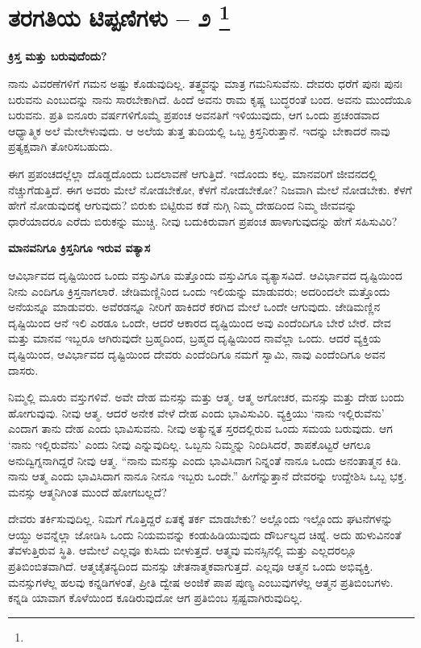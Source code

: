 
\chapter[ತರಗತಿಯ ಟಿಪ್ಪಣಿಗಳು – ೨ ]{ತರಗತಿಯ ಟಿಪ್ಪಣಿಗಳು – ೨ \protect\footnote{}}

\centerline{\textbf{ಕ್ರಿಸ್ತ ಮತ್ತು ಬರುವುದೆಂದು?}}

ನಾನು ವಿವರಣೆಗಳಿಗೆ ಗಮನ ಅಷ್ಟು ಕೊಡುವುದಿಲ್ಲ. ತತ್ತ್ವವನ್ನು ಮಾತ್ರ ಗಮನಿಸುವೆನು. ದೇವರು ಧರೆಗೆ ಪುನಃ ಪುನಃ ಬರುವನು ಎಂಬುದನ್ನು ನಾನು ಸಾರಬೇಕಾಗಿದೆ. ಹಿಂದೆ ಅವನು ರಾಮ ಕೃಷ್ಣ ಬುದ್ಧರಂತೆ ಬಂದ. ಅವನು ಮುಂದೆಯೂ ಬರುವನು. ಪ್ರತಿ ಐನೂರು ವರ್ಷಗಳಿಗೊಮ್ಮೆ ಪ್ರಪಂಚ ಅವನತಿಗೆ ಇಳಿಯುವುದು, ಆಗ ಒಂದು ಪ್ರಚಂಡವಾದ ಆಧ್ಯಾತ್ಮಿಕ ಅಲೆ ಮೇಲೇಳುವುದು. ಆ ಅಲೆಯ ತುತ್ತ ತುದಿಯಲ್ಲಿ ಒಬ್ಬ ಕ್ರಿಸ್ತನಿರುತ್ತಾನೆ. ಇದನ್ನು ಬೇಕಾದರೆ ನಾವು ಪ್ರತ್ಯಕ್ಷವಾಗಿ ತೋರಿಸಬಹುದು.

ಈಗ ಪ್ರಪಂಚದಲ್ಲೆಲ್ಲಾ ದೊಡ್ಡದೊಂದು ಬದಲಾವಣೆ ಆಗುತ್ತಿದೆ. ಇದೊಂದು ಕಲ್ಪ. ಮಾನವರಿಗೆ ಜೀವನದಲ್ಲಿ ನೆಚ್ಚುಗೆಡುತ್ತಿದೆ. ಈಗ ಅವರು ಮೇಲೆ ನೋಡಬೇಕೋ, ಕೆಳಗೆ ನೋಡಬೇಕೋ? ನಿಜವಾಗಿ ಮೇಲೆ ನೋಡಬೇಕು. ಕೆಳಗೆ ಹೇಗೆ ನೋಡುವುದಕ್ಕೆ ಆಗುವುದು? ಬಿರುಕು ಬಿಟ್ಟಿರುವ ಕಡೆ ನುಗ್ಗಿ ನಿಮ್ಮ ದೇಹದಿಂದ ನಿಮ್ಮ ಜೀವವನ್ನು ಧಾರೆಯಾದರೂ ಎರೆದು ಬಿರುಕನ್ನು ಮುಚ್ಚಿ. ನೀವು ಬದುಕಿರುವಾಗ ಪ್ರಪಂಚ ಹಾಳಾಗುವುದನ್ನು ಹೇಗೆ ಸಹಿಸುವಿರಿ?

\begin{center}
\textbf{ಮಾನವನಿಗೂ ಕ್ರಿಸ್ತನಿಗೂ ಇರುವ ವತ್ಯಾಸ}
\end{center}

ಆವಿರ್ಭಾವದ ದೃಷ್ಟಿಯಿಂದ ಒಂದು ವಸ್ತುವಿಗೂ ಮತ್ತೊಂದು ವಸ್ತುವಿಗೂ ವ್ಯತ್ಯಾಸವಿದೆ. ಆವಿರ್ಭಾವದ ದೃಷ್ಟಿಯಿಂದ ನೀನು ಎಂದಿಗೂ ಕ್ರಿಸ್ತನಾಗಲಾರೆ. ಜೇಡಿಮಣ್ಣಿನಿಂದ ಒಂದು ಇಲಿಯನ್ನು ಮಾಡುವರು; ಅದರಿಂದಲೇ ಮತ್ತೊಂದು ಅನೆಯನ್ನೂ ಮಾಡುವರು. ಅವೆರಡನ್ನೂ ನೀರಿಗೆ ಹಾಕಿದರೆ ಕರಗಿದ ಮೇಲೆ ಒಂದೇ ಆಗುವುದು. ಜೇಡಿಮಣ್ಣಿನ ದೃಷ್ಟಿಯಿಂದ ಆನೆ ಇಲಿ ಎರಡೂ ಒಂದೇ, ಆದರೆ ಆಕಾರದ ದೃಷ್ಟಿಯಿಂದ ಅವು ಎಂದೆಂದಿಗೂ ಬೇರೆ ಬೇರೆ. ದೇವ ಮತ್ತು ಮಾನವ ಇಬ್ಬರೂ ಆಗಿರುವುದೇ ಬ್ರಹ್ಮದಿಂದ, ಬ್ರಹ್ಮದ ದೃಷ್ಟಿಯಿಂದ ನಾವೆಲ್ಲಾ ಒಂದು. ಆದರೆ ವ್ಯಕ್ತಿಯ ದೃಷ್ಟಿಯಿಂದ, ಆವಿರ್ಭಾವದ ದೃಷ್ಟಿಯಿಂದ ದೇವರು ಎಂದೆಂದಿಗೂ ನಮಗೆ ಸ್ವಾಮಿ, ನಾವು ಎಂದೆಂದಿಗೂ ಅವನ ದಾಸರು.

ನಿಮ್ಮಲ್ಲಿ ಮೂರು ವಸ್ತುಗಳಿವೆ. ಅವೇ ದೇಹ ಮನಸ್ಸು ಮತ್ತು ಆತ್ಮ. ಆತ್ಮ ಅಗೋಚರ, ಮನಸ್ಸು ಮತ್ತು ದೇಹ ಬಂದು ಹೋಗುವುವು. ನೀವು ಆತ್ಮ. ಆದರೆ ಅನೇಕ ವೇಳೆ ದೇಹ ಎಂದು ಭಾವಿಸುವಿರಿ. ವ್ಯಕ್ತಿಯು ‘ನಾನು ಇಲ್ಲಿರುವೆನು’ ಎಂದಾಗ ತಾನು ದೇಹ ಎಂದು ಭಾವಿಸುವನು. ನೀವು ಅತ್ಯುನ್ನತ ಸ್ತರದಲ್ಲಿರುವ ಒಂದು ಸಮಯ ಬರುವುದು. ಆಗ ‘ನಾನು ಇಲ್ಲಿರುವೆನು’ ಎಂದು ನೀವು ಎನ್ನುವುದಿಲ್ಲ. ಒಬ್ಬನು ನಿಮ್ಮನ್ನು ನಿಂದಿಸಿದರೆ, ಶಾಪಕೊಟ್ಟರೆ ಆಗಲೂ ಅನುದ್ವಿಗ್ನನಾಗಿದ್ದರೆ ನೀವು ಆತ್ಮ. “ನಾನು ಮನಸ್ಸು ಎಂದು ಭಾವಿಸಿದಾಗ ನಿನ್ನಂತೆ ನಾನೂ ಒಂದು ಅನಂತಾತ್ಮನ ಕಿಡಿ. ನಾನು ಆತ್ಮ ಎಂದು ಭಾವಿಸಿದಾಗ ನಾನೂ ನೀನೂ ಇಬ್ಬರು ಒಂದೇ.” ಹೀಗೆನ್ನುತ್ತಾನೆ ದೇವರನ್ನು ಉದ್ದೇಶಿಸಿ ಒಬ್ಬ ಭಕ್ತ. ಮನಸ್ಸು ಆತ್ಮನಿಗಿಂತ ಮುಂದೆ ಹೋಗಬಲ್ಲದೆ?

ದೇವರು ತರ್ಕಿಸುವುದಿಲ್ಲ. ನಿಮಗೆ ಗೊತ್ತಿದ್ದರೆ ಏತಕ್ಕೆ ತರ್ಕ ಮಾಡಬೇಕು? ಅಲ್ಲೊಂದು ಇಲ್ಲೊಂದು ಘಟನೆಗಳನ್ನು ಆಯ್ದು ಅವನ್ನೆಲ್ಲಾ ಜೋಡಿಸಿ ಒಂದು ನಿಯಮವನ್ನು ಕಂಡುಹಿಡಿಯುವುದು ದೌರ್ಬಲ್ಯದ ಚಿಹ್ನೆ. ಅದು ಹುಳುವಿನಂತೆ ತೆವಳುತ್ತಿರುವ ಸ್ಥಿತಿ. ಆಮೇಲೆ ಎಲ್ಲವೂ ಕುಸಿದು ಬೀಳುತ್ತದೆ. ಆತ್ಮವು ಮನಸ್ಸಿನಲ್ಲಿ ಮತ್ತು ಎಲ್ಲದರಲ್ಲೂ ಪ್ರತಿಬಿಂಬಿತವಾಗಿದೆ. ಆತ್ಮಚೈತನ್ಯದಿಂದ ಮನಸ್ಸು ಚೇತನಾತ್ಮಕವಾಗುತ್ತದೆ. ಎಲ್ಲವೂ ಆತ್ಮನ ಒಂದು ಅಭಿವ್ಯಕ್ತಿ. ಮನಸ್ಸುಗಳೆಲ್ಲ ಹಲವು ಕನ್ನಡಿಗಳಂತೆ, ಪ್ರೀತಿ ದ್ವೇಷ ಅಂಜಿಕೆ ಪಾಪ ಪುಣ್ಯ ಎಂಬುವುಗಳೆಲ್ಲ ಆತ್ಮನ ಪ್ರತಿಬಿಂಬಗಳು. ಕನ್ನಡಿ ಯಾವಾಗ ಕೊಳೆಯಿಂದ ಕೂಡಿರುವುದೋ ಆಗ ಪ್ರತಿಬಿಂಬ ಸ್ಪಷ್ಟವಾಗಿರುವುದಿಲ್ಲ.

